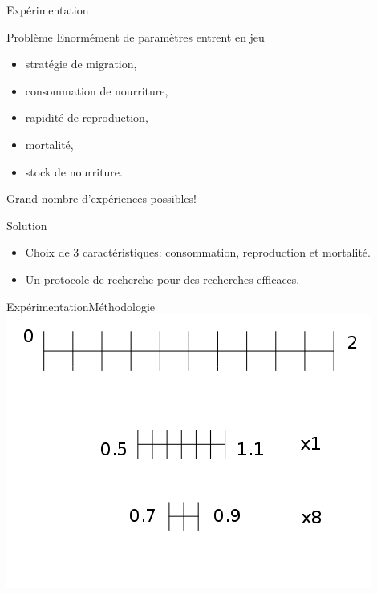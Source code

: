 \documentclass[t, 10pt]{beamer}
\begin{document}
        \begin{frame}[c]{Expérimentation}
          \begin{alertblock}{Problème}
            Enormément de paramètres entrent en jeu
            \begin{itemize}
            \item{stratégie de migration,}
            \item{consommation de nourriture,}
            \item{rapidité de reproduction,}
            \item{mortalité,}
            \item{stock de nourriture.}
            \end{itemize}
            Grand nombre d'expériences possibles!
          \end{alertblock}

          \pause

          \begin{block}{Solution}
            \begin{itemize}
            \item{Choix de 3 caractéristiques: consommation, reproduction et mortalité.}
            \item{Un protocole de recherche pour des recherches efficaces.}
            \end{itemize}
          \end{block}
        \end{frame}

        \begin{frame}{Expérimentation}{Méthodologie}
          \includegraphics[width=\textwidth]{img/recherche.png}
        \end{frame}
\end{document}
